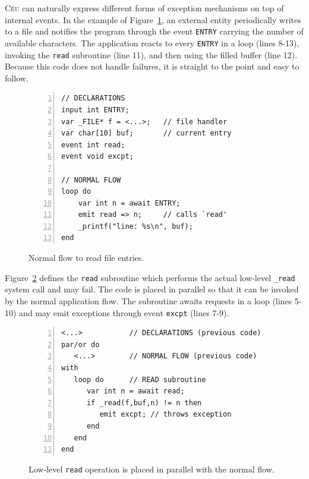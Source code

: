 \documentclass{acm_proc_article-sp}
\newcommand{\CEU}{\textsc{C\'{e}u}\xspace}
\newcommand{\code}[1] {{\small{\texttt{#1}}}}
\newcommand{\1}{\;}
\newcommand{\2}{\;\;}
\newcommand{\3}{\;\;\;}
\newcommand{\5}{\;\;\;\;\;}
\begin{document}
\CEU can naturally express different forms of exception mechanisms on top of 
internal events.
%
In the example of Figure~\ref{lst.excpt1}, an external entity periodically 
writes to a file and notifies the program through the event \code{ENTRY} 
carrying the number of available characters.
The application reacts to every \code{ENTRY} in a loop (lines 8-13), invoking 
the \code{read} subroutine (line 11), and then using the filled buffer (line 
12).
Because this code does not handle failures, it is straight to the point and 
easy to follow.

\begin{figure}[t]
\begin{lstlisting}[numbers=left,xleftmargin=2em]
// DECLARATIONS
input int ENTRY;
var _FILE* f = <...>;   // file handler
var char[10] buf;       // current entry
event int read;
event void excpt;

// NORMAL FLOW
loop do
    var int n = await ENTRY;
    emit read => n;     // calls `read'
    _printf("line: %s\n", buf);
end
\end{lstlisting}
\caption{ Normal flow to read file entries.
\label{lst.excpt1}
}
\end{figure}

Figure~\ref{lst.excpt2} defines the \code{read} subroutine which performs the 
actual low-level \code{\_read} system call and may fail.
The code is placed in parallel so that it can be invoked by the normal 
application flow.
The subroutine awaits requests in a loop (lines 5-10) and may emit
exceptions through event \code{excpt} (lines 7-9).

\begin{figure}[t]
\begin{lstlisting}[numbers=left,xleftmargin=2em]
<...>           // DECLARATIONS (previous code)
par/or do
   <...>        // NORMAL FLOW (previous code)
with
   loop do      // READ subroutine
      var int n = await read;
      if _read(f,buf,n) != n then
         emit excpt; // throws exception
      end
   end
end
\end{lstlisting}
\caption{ Low-level \code{read} operation is placed in parallel with the normal 
flow.
\label{lst.excpt2}
}
\end{figure}
\end{document}
